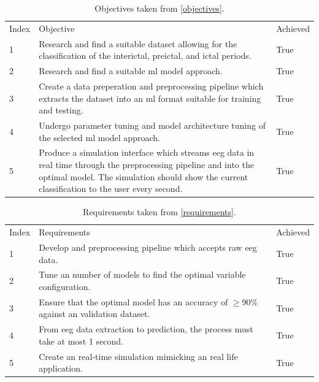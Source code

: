 \documentclass[12pt]{article}
\begin{document}
\begin{table}[H]
\centering
\begin{tabular}{p{}p{}p{}}
Index & Objective                                                                                                                                                                                                                    & Achieved \\
1     & Research and find a suitable dataset allowing for the classification of the interictal, preictal, and ictal periods.                                                                                                        & True     \\
2     & Research and find a suitable \acrshort{ml} model approach.                                                                                                                                                                  & True     \\
3     & Create a data preperation and preprocessing pipeline which extracts the dataset into an \acrshort{ml} format suitable for training and testing.                                                                              & True     \\
4     & Undergo parameter tuning and model architecture tuning of the selected \acrshort{ml} model approach.                                                                                                                         & True     \\
5     & Produce a simulation interface which streams \acrshort{eeg} data in real time through the preprocessing pipeline and into the optimal model. The simulation should show the current classification to the user every second. & True    
\end{tabular}
\caption{Objectives taken from \ref{objectives}.}
\label{tab:objectives-review}
\end{table}


\begin{table}[H]
\centering
\begin{tabular}{p{}p{}p{}}
Index & Requirements                                                                               & Achieved \\
1     & Develop and preprocessing pipeline which accepts raw \acrshort{eeg} data.                  & True     \\
2     & Tune an number of models to find the optimal variable configuration.                       & True     \\
3     & Ensure that the optimal model has an accuracy of $\geq90\%$ against an validation dataset. & True     \\
4     & From \acrshort{eeg} data extraction to prediction, the process must take at most 1 second. & True     \\
5     & Create an real-time simulation mimicking an real life application.                         & True    
\end{tabular}
\caption{Requirements taken from \ref{requirements}.}
\label{tab:requirements-review}
\end{table}
\end{document}
